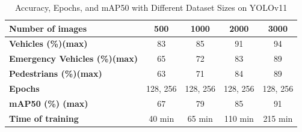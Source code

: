 \documentclass[conference]{IEEEtran}
\begin{document}
\begin{table}[H]
    \centering
    \hspace*{-1cm} %
    \setlength{\arrayrulewidth}{0.4pt}
    \renewcommand{\arraystretch}{1.2} %
    \caption{Accuracy, Epochs, and mAP50 with Different Dataset Sizes on YOLOv11}
    \vspace{0.3cm}
    \setlength{\tabcolsep}{4pt}       %
    \begin{tabular}{|>{\centering\arraybackslash}m{2.4cm}|c|c|c|c|}
        \hline
        \rowcolor{cyan!20}
        \textbf{Number of images} & \textbf{500} & \textbf{1000} & \textbf{2000} & \textbf{3000} \\ 
        \hline
        \textbf{Vehicles (\%)(max)}       & 83  & 85  & 91  & 94  \\ 
        \hline
        \textbf{Emergency Vehicles (\%)(max)} & 65  & 72  & 83  & 89  \\ 
        \hline
        \textbf{Pedestrians (\%)(max)}    & 63  & 71  & 84  & 89  \\ 
        \hline
        \textbf{Epochs}              & 128, 256 & 128, 256 & 128, 256 & 128, 256 \\ 
        \hline
        \textbf{mAP50 (\%) (max)}    & 67  & 79  & 85  & 91  \\ 
        \hline
        \textbf{Time of training}    & 40 min & 65 min & 110 min & 215 min \\ 
        \hline
    \end{tabular}
    \label{table:accuracy}
\end{table}
\end{document}
